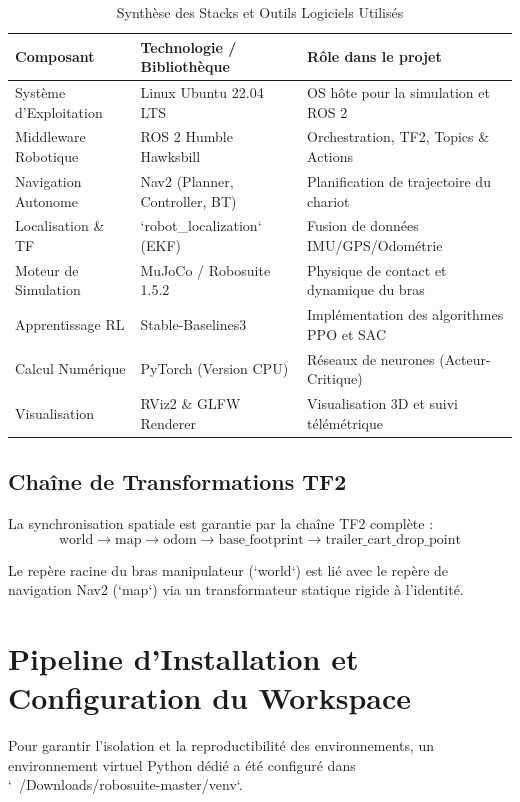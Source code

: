 \documentclass[11pt,a4paper]{article}
\begin{document}
\begin{table}[h!]
\centering
\caption{Synthèse des Stacks et Outils Logiciels Utilisés}
\begin{tabular}{lll}
\toprule
\textbf{Composant} & \textbf{Technologie / Bibliothèque} & \textbf{Rôle dans le projet} \\
\midrule
Système d'Exploitation & Linux Ubuntu 22.04 LTS & OS hôte pour la simulation et ROS 2 \\
Middleware Robotique & ROS 2 Humble Hawksbill & Orchestration, TF2, Topics \& Actions \\
Navigation Autonome & Nav2 (Planner, Controller, BT) & Planification de trajectoire du chariot \\
Localisation \& TF & `robot_localization` (EKF) & Fusion de données IMU/GPS/Odométrie \\
Moteur de Simulation & MuJoCo / Robosuite 1.5.2 & Physique de contact et dynamique du bras \\
Apprentissage RL & Stable-Baselines3 & Implémentation des algorithmes PPO et SAC \\
Calcul Numérique & PyTorch (Version CPU) & Réseaux de neurones (Acteur-Critique) \\
Visualisation & RViz2 \& GLFW Renderer & Visualisation 3D et suivi télémétrique \\
\bottomrule
\end{tabular}
\end{table}

\subsection{Chaîne de Transformations TF2}
La synchronisation spatiale est garantie par la chaîne TF2 complète :
$$\text{world} \longrightarrow \text{map} \longrightarrow \text{odom} \longrightarrow \text{base\_footprint} \longrightarrow \text{trailer\_cart\_drop\_point}$$

Le repère racine du bras manipulateur (`world`) est lié avec le repère de navigation Nav2 (`map`) via un transformateur statique rigide à l'identité.

\section{Pipeline d'Installation et Configuration du Workspace}

Pour garantir l'isolation et la reproductibilité des environnements, un environnement virtuel Python dédié a été configuré dans `~/Downloads/robosuite-master/venv`.
\end{document}

